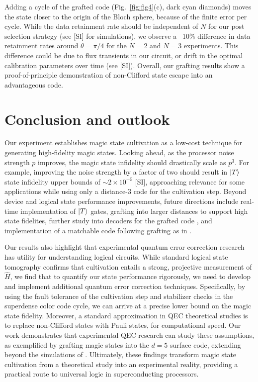 \documentclass[%
 reprint,
 amsmath,amssymb,
 aps,
]{revtex4-2}
\begin{document}
Adding a cycle of the grafted code (Fig.~\ref{fig:fig4}(c), dark cyan diamonds) moves the state closer to the origin of the Bloch sphere, because of the finite error per cycle. While the data retainment rate should be independent of $N$ for our post selection strategy (see [SI] for simulations), we observe a ~10\% difference in data retainment rates around $\theta = \pi/4$ for the $N = 2$ and $N = 3$ experiments. This difference could be due to flux transients in our circuit, or drift in the optimal calibration parameters over time (see [SI]). Overall, our grafting results show a proof-of-principle demonstration of non-Clifford state escape into an advantageous code.

\section{Conclusion and outlook}
Our experiment establishes magic state cultivation as a low-cost technique for generating high-fidelity magic states. Looking ahead, as the processor noise strength $p$ \cite{gidney_fault-tolerant_2021} improves, the magic state infidelity should drastically scale as $p^3$. For example, improving the noise strength by a factor of two should result in $\ket{T}$ state infidelity upper bounds of $\sim 2 \times 10^{-5}$ [SI], approaching relevance for some applications \cite{babbush_grand_2025, khattar_verifiable_2025, kan_resource-optimized_2025, low_fast_2025} while using only a distance-3 code for the cultivation step. Beyond device and logical state performance improvements, future directions include real-time implementation of $\ket{T}$ gates, grafting into larger distances to support high state fidelites, further study into decoders for the grafted code \cite{beni_tesseract_2025, bausch_learning_2024}, and implementation of a matchable code following grafting as in \cite{gidney_magic_2024}. 

Our results also highlight that experimental quantum error correction research has utility for understanding logical circuits. While standard logical state tomography confirms that cultivation entails a strong, projective measurement of $\hat{H}$, we find that to quantify our state performance rigorously, we need to develop and implement additional quantum error correction techniques. Specifically, by using the fault tolerance of the cultivation step and stabilizer checks in the superdense color code cycle, we can arrive at a precise lower bound on the magic state fidelity. Moreover, a standard approximation in QEC theoretical studies is to replace non-Clifford states with Pauli states, for computational speed. Our work demonstrates that experimental QEC research can study these assumptions, as exemplified by grafting magic states into the $d=5$ surface code, extending beyond the simulations of \cite{gidney_magic_2024}. Ultimately, these findings transform magic state cultivation from a theoretical study into an experimental reality, providing a practical route to universal logic in superconducting processors. 
\end{document}
